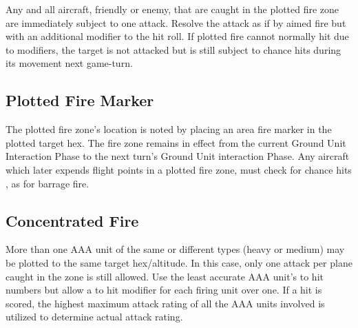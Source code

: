 Any and all aircraft, friendly or enemy, that are caught in the plotted fire zone are immediately subject to one attack. Resolve the attack as if by aimed fire but with an additional  modifier to the hit roll. If plotted fire cannot normally hit due to modifiers, the target is not attacked but is still subject to chance hits during its movement next game-turn.

\subsection{Plotted Fire Marker} The plotted fire zone's location is noted by placing an area fire marker in the plotted target hex. The fire zone remains in effect from the current Ground Unit Interaction Phase to the next turn's Ground Unit interaction Phase. Any aircraft which later expends flight points in a plotted fire zone, must check for chance hits  , as for barrage fire. 

\subsection{Concentrated Fire} More than one AAA unit of the same or different types (heavy or medium) may be plotted to the same target hex/altitude. In this case, only one attack per plane caught in the zone is still allowed. Use the least accurate AAA unit's to hit numbers but allow a  to hit modifier for each firing unit over one. If a hit is scored, the highest maximum attack rating of all the AAA units involved is utilized to determine actual attack rating.


